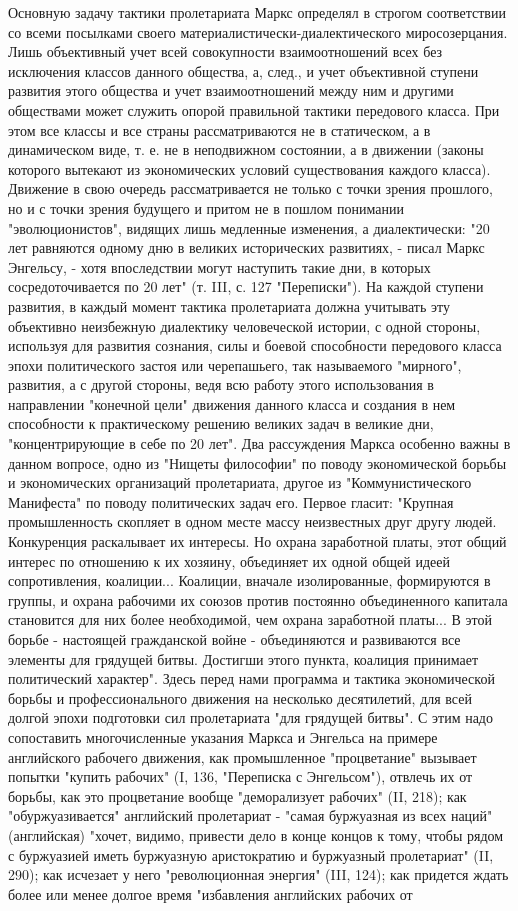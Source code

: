 \documentclass[12pt]{article}
\newcommand{\parnum}{(\arabic{parcount})}
\newcounter{parcount}
\newenvironment{parnumbers}{%
  \par%
  \everypar{\noindent \stepcounter{parcount}\marginpar[]{\parnum}}%
}{}
\begin{document}
\begin{parnumbers}
    Основную задачу тактики пролетариата Маркс определял в строгом соответствии со всеми посылками своего материалистически-диалектического миросозерцания. Лишь объективный учет всей совокупности взаимоотношений всех без исключения классов данного общества, а, след., и учет объективной ступени развития этого общества и учет взаимоотношений между ним и другими обществами может служить опорой правильной тактики передового класса. При этом все классы и все страны рассматриваются не в статическом, а в динамическом виде, т. е. не в неподвижном состоянии, а в движении (законы которого вытекают из экономических условий существования каждого класса). Движение в свою очередь рассматривается не только с точки зрения прошлого, но и с точки зрения будущего и притом не в пошлом понимании "эволюционистов", видящих лишь медленные изменения, а диалектически: "20 лет равняются одному дню в великих исторических развитиях, - писал Маркс Энгельсу, - хотя впоследствии могут наступить такие дни, в которых сосредоточивается по 20 лет" (т. III, с. 127 "Переписки"). На каждой ступени развития, в каждый момент тактика пролетариата должна учитывать эту объективно неизбежную диалектику человеческой истории, с одной стороны, используя для развития сознания, силы и боевой способности передового класса эпохи политического застоя или черепашьего, так называемого "мирного", развития, а с другой стороны, ведя всю работу этого использования в направлении "конечной цели" движения данного класса и создания в нем способности к практическому решению великих задач в великие дни, "концентрирующие в себе по 20 лет". Два рассуждения Маркса особенно важны в данном вопросе, одно из "Нищеты философии" по поводу экономической борьбы и экономических организаций пролетариата, другое из "Коммунистического Манифеста" по поводу политических задач его. Первое гласит: "Крупная промышленность скопляет в одном месте массу неизвестных друг другу людей. Конкуренция раскалывает их интересы. Но охрана заработной платы, этот общий интерес по отношению к их хозяину, объединяет их одной общей идеей сопротивления, коалиции... Коалиции, вначале изолированные, формируются в группы, и охрана рабочими их союзов против постоянно объединенного капитала становится для них более необходимой, чем охрана заработной платы... В этой борьбе - настоящей гражданской войне - объединяются и развиваются все элементы для грядущей битвы. Достигши этого пункта, коалиция принимает политический характер". Здесь перед нами программа и тактика экономической борьбы и профессионального движения на несколько десятилетий, для всей долгой эпохи подготовки сил пролетариата "для грядущей битвы". С этим надо сопоставить многочисленные указания Маркса и Энгельса на примере английского рабочего движения, как промышленное "процветание" вызывает попытки "купить рабочих" (I, 136, "Переписка с Энгельсом"), отвлечь их от борьбы, как это процветание вообще "деморализует рабочих" (II, 218); как "обуржуазивается" английский пролетариат - "самая буржуазная из всех наций" (английская) "хочет, видимо, привести дело в конце концов к тому, чтобы рядом с буржуазией иметь буржуазную аристократию и буржуазный пролетариат" (II, 290); как исчезает у него "революционная энергия" (III, 124); как придется ждать более или менее долгое время "избавления английских рабочих от 
\end{parnumbers}
\end{document}
